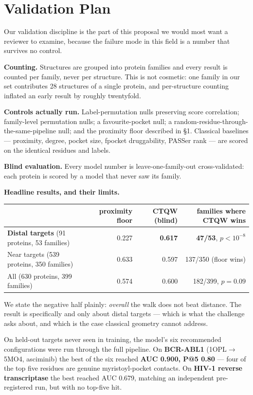 \documentclass[10pt,a4paper,twocolumn]{article}
\newcommand{\num}[1]{\textbf{#1}}
\begin{document}
\section{Validation Plan}

Our validation discipline is the part of this proposal we would most want a reviewer to examine,
because the failure mode in this field is a number that survives no control.

\textbf{Counting.} Structures are grouped into protein families and every result is counted per
family, never per structure. This is not cosmetic: one family in our set contributes 28 structures
of a single protein, and per-structure counting inflated an early result by roughly twentyfold.

\textbf{Controls actually run.} Label-permutation nulls preserving score correlation; family-level
permutation nulls; a favourite-pocket null; a random-residue-through-the-same-pipeline null; and
the proximity floor described in \S1. Classical baselines --- proximity, degree, pocket size,
fpocket druggability, PASSer rank --- are scored on the identical residues and labels.

\textbf{Blind evaluation.} Every model number is leave-one-family-out cross-validated: each protein
is scored by a model that never saw its family.

\textbf{Headline results, and their limits.}

\begin{table}[t]\centering\small
\begin{tabular}{lrrr}
\toprule
& proximity floor & CTQW (blind) & families where CTQW wins \\ \midrule
\textbf{Distal targets} (91 proteins, 53 families) & 0.227 & \num{0.617} & \num{47/53}, $p<10^{-8}$ \\
Near targets (539 proteins, 350 families) & 0.633 & 0.597 & 137/350 (floor wins) \\
All (630 proteins, 399 families) & 0.574 & 0.600 & 182/399, $p=0.09$ \\
\bottomrule
\end{tabular}
\end{table}

We state the negative half plainly: \emph{overall} the walk does not beat distance. The result is
specifically and only about distal targets --- which is what the challenge asks about, and which
is the case classical geometry cannot address.

On held-out targets never seen in training, the model's six recommended configurations were run
through the full pipeline. On \textbf{BCR-ABL1} (1OPL$\to$5MO4, asciminib) the best of the six
reached \num{AUC 0.900, P@5 0.80} --- four of the top five residues are genuine myristoyl-pocket
contacts. On \textbf{HIV-1 reverse transcriptase} the best reached AUC 0.679, matching an
independent pre-registered run, but with no top-five hit.
\end{document}
